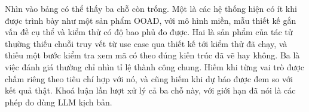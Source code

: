 Nhìn vào bảng có thể thấy ba chỗ còn trống. Một là các hệ thống hiện có ít khi được trình bày như một sản phẩm OOAD, với mô hình miền, mẫu thiết kế gắn vấn đề cụ thể và kiểm thử có độ bao phủ đo được. Hai là sản phẩm của tác tử thường thiếu chuỗi truy vết từ use case qua thiết kế tới kiểm thử đã chạy, và thiếu một bước kiểm tra xem mã có theo đúng kiến trúc đã vẽ hay không. Ba là việc đánh giá thường chỉ nhìn tỉ lệ thành công chung. Hiếm khi từng vai trò được chấm riêng theo tiêu chí hợp với nó, và cũng hiếm khi dự báo được đem so với kết quả thật. Khoá luận lần lượt xử lý cả ba chỗ này, với giới hạn đã nói là các phép đo dùng LLM kịch bản.

